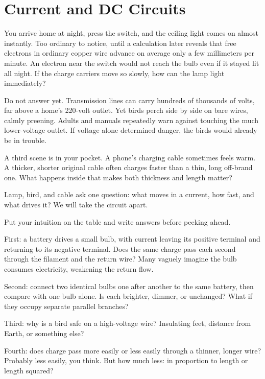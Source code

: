 \chapter{Current and DC Circuits}


You arrive home at night, press the switch, and the ceiling light comes on almost instantly. Too ordinary to notice, until a calculation later reveals that free electrons in ordinary copper wire advance on average only a few millimeters per minute. An electron near the switch would not reach the bulb even if it stayed lit all night. If the charge carriers move so slowly, how can the lamp light immediately?

Do not answer yet. Transmission lines can carry hundreds of thousands of volts, far above a home's 220-volt outlet. Yet birds perch side by side on bare wires, calmly preening. Adults and manuals repeatedly warn against touching the much lower-voltage outlet. If voltage alone determined danger, the birds would already be in trouble.

A third scene is in your pocket. A phone's charging cable sometimes feels warm. A thicker, shorter original cable often charges faster than a thin, long off-brand one. What happens inside that makes both thickness and length matter?

Lamp, bird, and cable ask one question: what moves in a current, how fast, and what drives it? We will take the circuit apart.


Put your intuition on the table and write answers before peeking ahead.

First: a battery drives a small bulb, with current leaving its positive terminal and returning to its negative terminal. Does the same charge pass each second through the filament and the return wire? Many vaguely imagine the bulb consumes electricity, weakening the return flow.

Second: connect two identical bulbs one after another to the same battery, then compare with one bulb alone. Is each brighter, dimmer, or unchanged? What if they occupy separate parallel branches?

Third: why is a bird safe on a high-voltage wire? Insulating feet, distance from Earth, or something else?

Fourth: does charge pass more easily or less easily through a thinner, longer wire? Probably less easily, you think. But how much less: in proportion to length or length squared?

